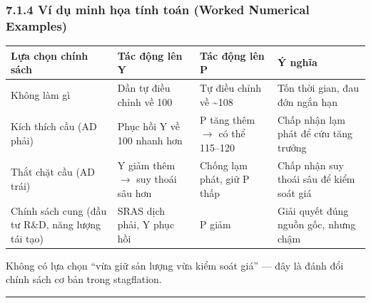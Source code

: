 \documentclass[
]{article}
\newcounter{none} %
\begin{document}
\subsubsection{7.1.4 Ví dụ minh họa tính toán (Worked Numerical
Examples)}\label{vuxed-dux1ee5-minh-hux1ecda-tuxednh-touxe1n-worked-numerical-examples-16}

{\def\LTcaptype{none} %
\begin{longtable}[]{@{}
  >{\raggedright\arraybackslash}p{}
  >{\raggedright\arraybackslash}p{}
  >{\raggedright\arraybackslash}p{}
  >{\raggedright\arraybackslash}p{}@{}}
\toprule\noalign{}
\begin{minipage}[b]{\linewidth}\raggedright
Lựa chọn chính sách
\end{minipage} & \begin{minipage}[b]{\linewidth}\raggedright
Tác động lên Y
\end{minipage} & \begin{minipage}[b]{\linewidth}\raggedright
Tác động lên P
\end{minipage} & \begin{minipage}[b]{\linewidth}\raggedright
Ý nghĩa
\end{minipage} \\
\midrule\noalign{}
\endhead
\bottomrule\noalign{}
\endlastfoot
Không làm gì & Dần tự điều chỉnh về 100 & Tự điều chỉnh về
\textasciitilde108 & Tốn thời gian, đau đớn ngắn hạn \\
Kích thích cầu (AD phải) & Phục hồi Y về 100 nhanh hơn & P tăng thêm
\(\rightarrow\) có thể 115--120 & Chấp nhận lạm phát để cứu tăng
trưởng \\
Thắt chặt cầu (AD trái) & Y giảm thêm \(\rightarrow\) suy thoái sâu hơn
& Chống lạm phát, giữ P thấp & Chấp nhận suy thoái sâu để kiểm soát
giá \\
Chính sách cung (đầu tư R\&D, năng lượng tái tạo) & SRAS dịch phải, Y
phục hồi & P giảm & Giải quyết đúng nguồn gốc, nhưng chậm \\
\end{longtable}
}

Không có lựa chọn ``vừa giữ sản lượng vừa kiểm soát giá'' --- đây là
đánh đổi chính sách cơ bản trong stagflation.

\begin{center}\rule{0.5\linewidth}{0.5pt}\end{center}
\end{document}
